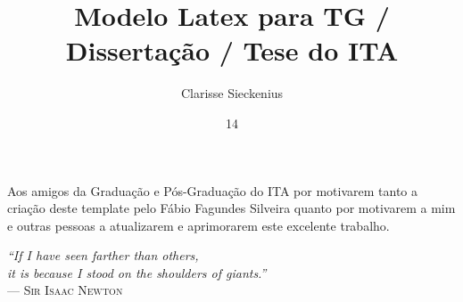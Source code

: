 \documentclass[dsc,eng]{ita} %
\author{Clarisse Sieckenius}{de~Souza}
\title{Modelo Latex para TG / Dissertação / Tese do ITA}
\date{14}{março}{2024}
\begin{document}
  \maketitle

  \begin{itadedication}
    Aos amigos da Graduação e Pós-Graduação do ITA por motivarem tanto a criação
    deste template pelo Fábio Fagundes Silveira quanto por motivarem a mim e
    outras pessoas a atualizarem e aprimorarem este excelente trabalho.
  \end{itadedication}

  \begin{itathanks}
    
  \end{itathanks}

  \thispagestyle{empty}
  \ifhyperref{}\fi
  \begin{flushright}
    \begin{spacing}{1.15}
      \mbox{}\vfill
      {\sffamily\itshape
      ``If I have seen farther than others,\\
      it is because I stood on the shoulders of giants.''\\}
      --- \textsc{Sir Isaac Newton}
    \end{spacing}
  \end{flushright}

  \begin{abstract}
    \noindent
    
  \end{abstract}

  \begin{englishabstract}
    \noindent
    
  \end{englishabstract}

  \listoffigures

  \listoftables

  \listofabbreviations
  

  \listofsymbols
  

  \tableofcontents

  \mainmatter %
\end{document}

